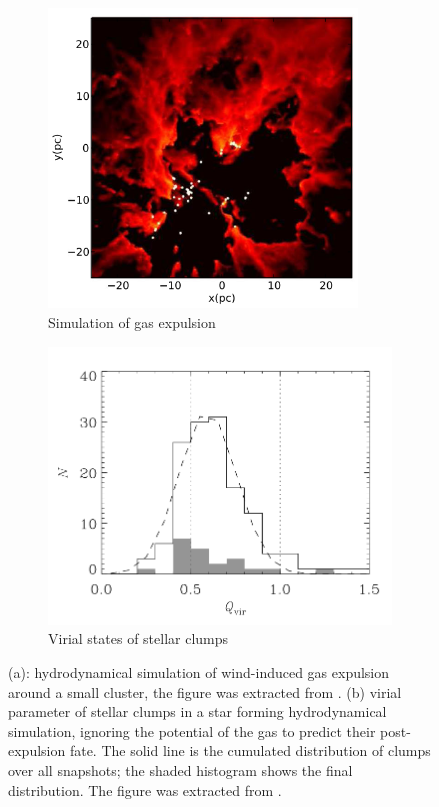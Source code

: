 \begin{figure}
\center
    \centering
    \begin{subfigure}[b]{0.48\textwidth}
        \includegraphics[width=0.9\textwidth]{Figures/0_ejectionwind.png}
        \caption{Simulation of gas expulsion}
        \label{Fig:0_ejection_1}
    \end{subfigure}
    \begin{subfigure}[b]{0.48\textwidth}

        \includegraphics[width=\textwidth]{Figures/0_virializedclumps.png}
        \caption{Virial states of stellar clumps}
        \label{Fig:0_ejection_2}
    \end{subfigure}
\caption{(a): hydrodynamical simulation of wind-induced gas expulsion around a small cluster, the figure was extracted from \cite{Dale2013}. (b) virial parameter of stellar clumps in a star forming hydrodynamical simulation, ignoring the potential of the gas to predict their post-expulsion fate. The solid line is the cumulated distribution of clumps over all snapshots; the shaded histogram shows the final distribution. The figure was extracted from \cite{Kruijssen2012}.}
\label{Fig:0_clumps}
\end{figure}

